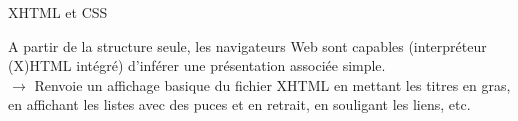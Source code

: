\begin{frame}[containsverbatim]{XHTML et CSS}

A partir de la structure seule, les navigateurs Web sont capables (interpr\'eteur (X)HTML int\'egr\'e) d'inf\'erer une pr\'esentation associ\'ee simple.\\

$\rightarrow$ Renvoie un affichage basique du fichier XHTML en mettant les titres en gras, en affichant les listes avec des puces et en retrait, en souligant les liens, etc. 

\begin{center}
\end{center}

\end{frame}


